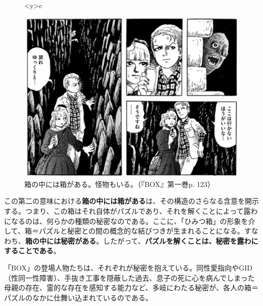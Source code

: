 \documentclass[9pt,b5j,twoside,twocolumn]{utarticle}
\begin{document}
\begin{figure}[h]
\begin{tabular}<y>{c}
\begin{minipage}[c]{0.72\hsize}
\centering
\includegraphics[scale=0.45]{箱と怪物}
\caption{箱の中には箱がある。怪物もいる。（『BOX』第一巻p. 123）}
\end{minipage}
\end{tabular}
\end{figure}

この第二の意味における\textbf{箱の中には箱がある}は、その構造のさらなる含意を開示する。つまり、この箱はそれ自体がパズルであり、それを解くことによって露わになるのは、何らかの種類の秘密なのである。ここに、「ひみつ箱」の形象を介して、箱＝パズルと秘密との間の概念的な結びつきが生まれることになる。すなわち、\textbf{箱の中には秘密がある}。したがって、\textbf{パズルを解くことは、秘密を露わにすることである}。

「BOX」の登場人物たちは、それぞれが秘密を抱えている。同性愛指向やGID（性同一性障害）、手抜き工事を隠蔽した過去、息子の死に心を病んでしまった母親の存在、霊的な存在を感知する能力など、多岐にわたる秘密が、各人の箱＝パズルのなかに仕舞い込まれているのである。
\end{document}
